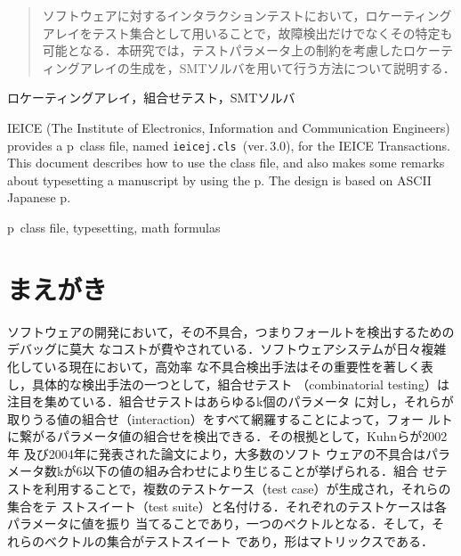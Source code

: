 \documentclass[paper]{ieicej}
\def\IEICEJcls{\texttt{ieicej.cls}}
\def\IEICEJver{3.0}
\begin{document}
\makeatletter
\if@letter
\makeatother
\maketitle
\fi
\begin{abstract}
ソフトウェアに対するインタラクションテストにおいて，ロケーティングアレイをテスト集合として用いることで，故障検出だけでなくその特定も可能となる．本研究では，テストパラメータ上の制約を考慮したロケーティングアレイの生成を，SMTソルバを用いて行う方法について説明する．
\end{abstract}
\begin{keyword}
ロケーティングアレイ，組合せテスト，SMTソルバ
\end{keyword}
\begin{eabstract}
IEICE (The Institute of Electronics, Information and Communication Engineers)
provides a p\LaTeXe\ class file, named \IEICEJcls\ (ver.\,\IEICEJver),
for the IEICE Transactions. This document describes how to use
the class file, and also makes some remarks about typesetting
a manuscript by using the p\LaTeXe.
The design is based on ASCII Japanese p\LaTeXe.
\end{eabstract}
\begin{ekeyword}
p\LaTeXe\ class file, typesetting, math formulas
\end{ekeyword}
\makeatletter
\if@letter
\makeatother
\else
 \maketitle
\fi

\section{まえがき}
\label{sec:intro}
ソフトウェアの開発において，その不具合，つまりフォールトを検出するためのデバッグに莫大
なコストが費やされている．ソフトウェアシステムが日々複雑化している現在において，高効率
な不具合検出手法はその重要性を著しく表し，具体的な検出手法の一つとして，組合せテスト
（combinatorial testing）は注目を集めている．組合せテストはあらゆるk個のパラメータ
に対し，それらが取りうる値の組合せ（interaction）をすべて網羅することによって，フォー
ルトに繋がるパラメータ値の組合せを検出できる．その根拠として，Kuhnらが2002年
\cite{kuhn2002}及び2004年\cite{kuhn2004}に発表された論文により，大多数のソフト
ウェアの不具合はパラメータ数kが6以下の値の組み合わせにより生じることが挙げられる．組合
せテストを利用することで，複数のテストケース（test case）が生成され，それらの集合をテ
ストスイート（test suite）と名付ける．それぞれのテストケースは各パラメータに値を振り
当てることであり，一つのベクトルとなる．そして，それらのベクトルの集合がテストスイート
であり，形はマトリックスである．
\end{document}
